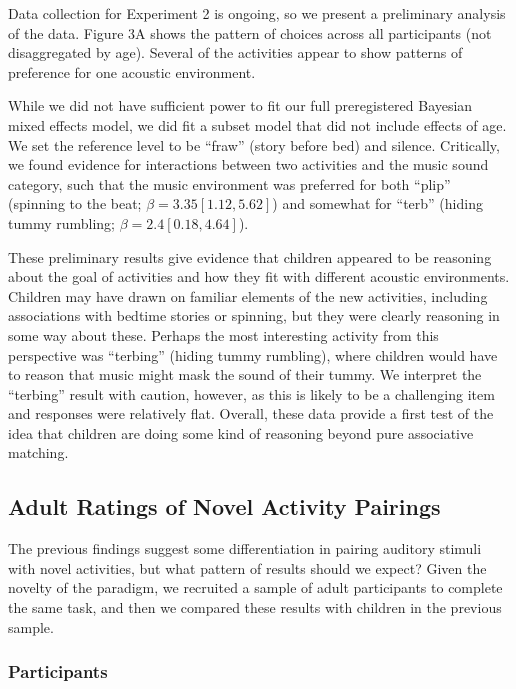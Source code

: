 \documentclass[10pt, letterpaper]{article}
\begin{document}
Data collection for Experiment 2 is ongoing, so we present a preliminary
analysis of the data. Figure 3A shows the pattern of choices across all
participants (not disaggregated by age). Several of the activities
appear to show patterns of preference for one acoustic environment.

While we did not have sufficient power to fit our full preregistered
Bayesian mixed effects model, we did fit a subset model that did not
include effects of age. We set the reference level to be ``fraw'' (story
before bed) and silence. Critically, we found evidence for interactions
between two activities and the music sound category, such that the music
environment was preferred for both ``plip'' (spinning to the beat;
\(\beta = 3.35 [1.12, 5.62]\)) and somewhat for ``terb'' (hiding tummy
rumbling; \(\beta = 2.4 [0.18, 4.64]\)).

These preliminary results give evidence that children appeared to be
reasoning about the goal of activities and how they fit with different
acoustic environments. Children may have drawn on familiar elements of
the new activities, including associations with bedtime stories or
spinning, but they were clearly reasoning in some way about these.
Perhaps the most interesting activity from this perspective was
``terbing'' (hiding tummy rumbling), where children would have to reason
that music might mask the sound of their tummy. We interpret the
``terbing'' result with caution, however, as this is likely to be a
challenging item and responses were relatively flat. Overall, these data
provide a first test of the idea that children are doing some kind of
reasoning beyond pure associative matching.

\hypertarget{adult-ratings-of-novel-activity-pairings}{%
\subsection{Adult Ratings of Novel Activity
Pairings}\label{adult-ratings-of-novel-activity-pairings}}

The previous findings suggest some differentiation in pairing auditory
stimuli with novel activities, but what pattern of results should we
expect? Given the novelty of the paradigm, we recruited a sample of
adult participants to complete the same task, and then we compared these
results with children in the previous sample.

\hypertarget{participants-2}{%
\subsubsection{Participants}\label{participants-2}}
\end{document}
